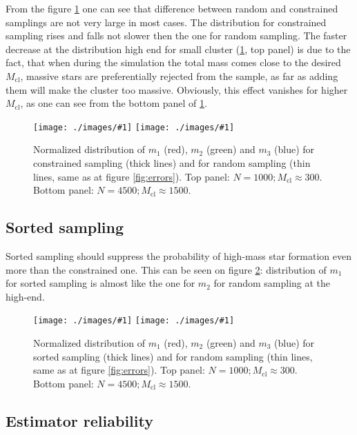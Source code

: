 \documentclass[a4paper,10pt]{article}
\newcommand{\Mcl}{M_{\mathrm{cl}}}
\newcommand{\includeEPSx}[1]{\texttt{[image: ./images/\#1]}}
\begin{document}
From the figure \ref{fig:compare2} one can see that difference between random and constrained samplings are not very large in most cases. The distribution for constrained sampling rises and falls not slower then the one for random sampling. The faster decrease at the distribution high end for small cluster (\ref{fig:compare2}, top panel) is due to the fact, that when during the simulation the total mass comes close to the desired $\Mcl$, massive stars are preferentially rejected from the sample, as far as adding them will make the cluster too massive. Obviously, this effect vanishes for higher $\Mcl$, as one can see from the bottom panel of \ref{fig:compare2}.	

\begin{figure}
  \begin{center}
   \includeEPSx{compare2.eps}
   \includeEPSx{compare2a.eps}
  \end{center}
 \caption{Normalized distribution of $m_1$ (red), $m_2$ (green) and $m_3$ (blue) for constrained sampling (thick lines) and for random sampling (thin lines, same as at figure \ref{fig:errors}). Top panel: $N = 1000; \Mcl \approx 300$. Bottom panel:  $N = 4500; \Mcl \approx 1500$.  } \label{fig:compare2}
\end{figure}


\subsection{Sorted sampling}\label{sec:sorted}

Sorted sampling should suppress the probability of high-mass star formation even more than the constrained one. This can be seen on figure \ref{fig:compare3}: distribution of $m_1$ for sorted sampling is almost like the one for $m_2$ for random sampling at the high-end.

\begin{figure} 
  \begin{center}
   \includeEPSx{compare3.eps}
   \includeEPSx{compare3a.eps}
  \end{center}
 \caption{Normalized distribution of $m_1$ (red), $m_2$ (green) and $m_3$ (blue) for sorted sampling (thick lines) and for random sampling (thin lines, same as at figure \ref{fig:errors}). Top panel: $N = 1000; \Mcl \approx 300$. Bottom panel:  $N = 4500; \Mcl \approx 1500$.  }\label{fig:compare3}
\end{figure}

\subsection{Estimator reliability}
\end{document}

